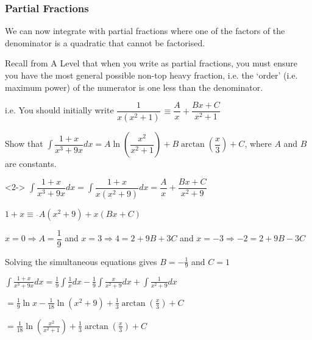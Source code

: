\documentclass{beamer}
\begin{document}
	\begin{frame}[shrink=40]
		\frametitle{Partial Fractions}
		We can now integrate with partial fractions where one of the factors of the denominator is a quadratic that cannot be factorised.
		
		\alert{Recall from A Level that when you write as partial fractions, you must ensure you have the most general possible non-top heavy fraction, i.e. the ‘order’ (i.e. maximum power) of the numerator is one less than the denominator.}
		
		i.e. You should initially write $\dfrac{1}{x\left( x^{2}+1\right) }\dfrac{}{}\equiv \dfrac{A}{x}+\dfrac{Bx+C}{x^{2}+1}$
		
		\begin{problem}
			Show that $\int \dfrac{1+x}{x^{3}+9x}dx=A\ln \left( \dfrac{x^{2}}{x^{2}+1}\right) +B\arctan \left( \dfrac{x}{3}\right) +C$, where $A$ and $B$ are constants.
		\end{problem}
		\begin{solution}<2->
			$\int \dfrac{1+x}{x^{3}+9x}dx = \int \dfrac{1+x}{x(x^{2}+9)}dx = \dfrac{A}{x}+\dfrac{Bx+C}{x^{2}+9}$
			
			$1+x\equiv \overline{}A\left( x^{2}+9\right) +x\left( Bx+C\right)$
			
			$x=0\Rightarrow A=\dfrac{1}{9}$ and $x=3\Rightarrow 4=2+9B+3C$ and $x=-3 \Rightarrow -2 = 2 +9B - 3C$
			
			Solving the simultaneous equations gives $B = -\frac{1}{9}$ and $C = 1$
			
			$\int \frac{1+x}{x^{3}+9x}dx= \frac{1}{9} \int \frac{1}{x}dx - \frac{1}{9}\int\frac{x}{x^{2}+9}dx + \int \frac{1}{x^{2}+9}dx$
			
			\hspace*{50pt}$=\frac{1}{9}\ln x-\frac{1}{18}\ln \left( x^{2}+9\right) +\frac{1}{3}\arctan \left( \frac{x}{3}\right) +C$
			
			\hspace*{50pt}$=\frac{1}{18}\ln \left( \frac{x^{2}}{x^{2}+1}\right) +\frac{1}{3}\arctan \left( \frac{x}{3}\right) +C$
		\end{solution}
		
	\end{frame}
	
\end{document}
